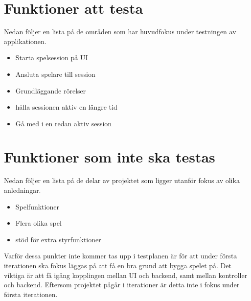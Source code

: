\documentclass[10pt]{article}
\begin{document}
	
	
	

\section{Funktioner att testa}
	Nedan följer en lista på de områden som har huvudfokus under testningen av applikationen.
	\begin{itemize}
	\item Starta spelsession på UI 
	\item Ansluta spelare till session
	\item Grundläggande rörelser
	\item hålla sessionen aktiv en längre tid
	\item Gå med i en redan aktiv session
	\end{itemize}
	
	
	
\section{Funktioner som inte ska testas}
	Nedan följer en lista på de delar av projektet som ligger utanför fokus av olika anledningar.
	\begin{itemize}
	\item Spelfunktioner
	\item Flera olika spel
	\item stöd för extra styrfunktioner
	\end{itemize}
	Varför dessa punkter inte kommer tas upp i testplanen är för att under första iterationen ska fokus läggas på att få en bra grund att bygga spelet på. Det viktiga är att få igång kopplingen mellan UI och backend, samt mellan kontroller och backend. Eftersom projektet pågår i iterationer är detta inte i fokus under första iterationen.
\end{document}
